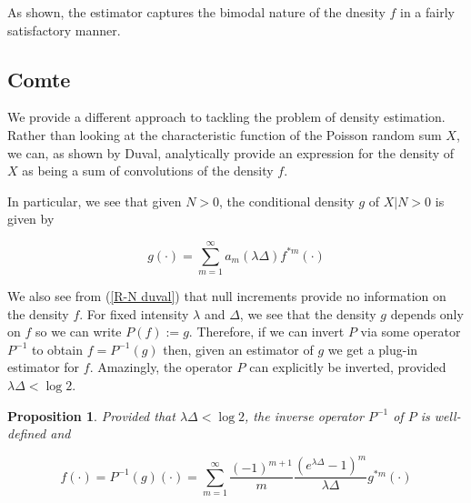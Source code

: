 \documentclass[a4paper,11pt]{article}
\theoremstyle{theorem}
\newtheorem{prop}{Proposition}[section]
\theoremstyle{definition}
\theoremstyle{remark}
\begin{document}
As shown, the estimator captures the bimodal nature of the dnesity $f$ in a fairly satisfactory manner.

\subsection{Comte}

We provide a different approach to tackling the problem of density estimation. Rather than looking at the characteristic function of the Poisson random sum $X$, we can, as shown by Duval, analytically provide an expression for the density of $X$ as being a sum of convolutions of the density $f$.

In particular, we see that given $N > 0$, the conditional density $g$ of $X | N > 0$ is given by

\begin{equation}
g(\cdot) = \sum_{m = 1}^{\infty}{a_m(\lambda \Delta) f^{\ast m}(\cdot)}
\end{equation}

We also see from (\ref{R-N duval}) that null increments provide no information on the density $f$. For fixed intensity $\lambda$ and $\Delta$, we see that the density $g$ depends only on $f$ so we can write $P(f) := g$. Therefore, if we can invert $P$ via some operator $P^{-1}$ to obtain $f = P^{-1}(g)$ then, given an estimator of $g$ we get a plug-in estimator for $f$. Amazingly, the operator $P$ can explicitly be inverted, provided $\lambda \Delta < \log 2$.

\begin{prop}
Provided that $\lambda \Delta < \log 2$, the inverse operator $P^{-1}$ of $P$ is well-defined and

\begin{equation}
f(\cdot) = P^{-1}(g)(\cdot) = \sum_{m=1}^{\infty}{\frac{(-1)^{m+1}}{m}\frac{(e^{\lambda \Delta} - 1)^m}{\lambda \Delta} g^{\ast m}(\cdot)}
\end{equation}
\end{prop}
\end{document}
